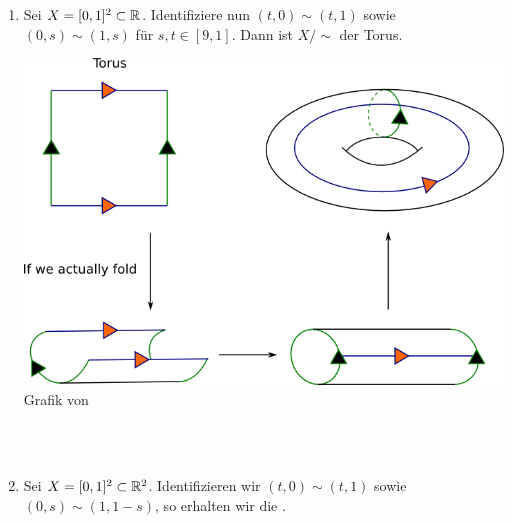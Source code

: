 \begin{example}
    \begin{enumerate}[1)]
        \item Sei $X = [0,1]^2 \subset \mathbb{R}$. Identifiziere nun $(t,0) \sim  (t,1)$ sowie $(0,s) \sim  (1,s)$ für $s,t\in [9,1]$. Dann ist $X / \sim $ der Torus.
        \begin{minipage}{\textwidth}
            \centering
            \includegraphics[width=\textwidth]{figures/part1.png}
            \scriptsize Grafik von \cite{img:torus-folding}
            \end{minipage} \\ \\
        \item Sei $X = [0,1] ^2 \subset \mathbb{R}^2$. Identifizieren wir $(t,0) \sim  (t,1)$ sowie $(0,s) \sim  (1, 1-s)$, so erhalten wir die . 
            \begin{minipage}{\textwidth}
                \centering
                \begin{minipage}{0.3\textwidth}

\end{minipage}
\end{minipage}
\end{enumerate}
\end{example}
